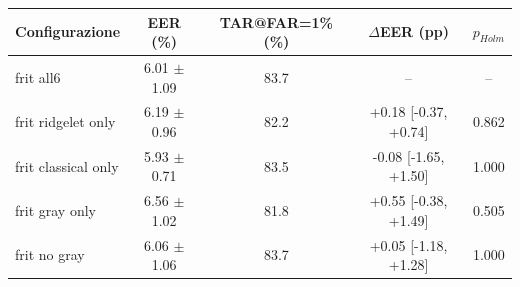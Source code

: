 \begin{tabular}{lcccc}
\toprule
Configurazione & EER (\%) & TAR@FAR=1\% (\%) & $\Delta$EER (pp) & $p_{Holm}$ \\
\midrule
frit all6 & 6.01 $\pm$ 1.09 & 83.7 & -- & -- \\
frit ridgelet only & 6.19 $\pm$ 0.96 & 82.2 & +0.18 [-0.37, +0.74] & 0.862 \\
frit classical only & 5.93 $\pm$ 0.71 & 83.5 & -0.08 [-1.65, +1.50] & 1.000 \\
frit gray only & 6.56 $\pm$ 1.02 & 81.8 & +0.55 [-0.38, +1.49] & 0.505 \\
frit no gray & 6.06 $\pm$ 1.06 & 83.7 & +0.05 [-1.18, +1.28] & 1.000 \\
\bottomrule
\end{tabular}